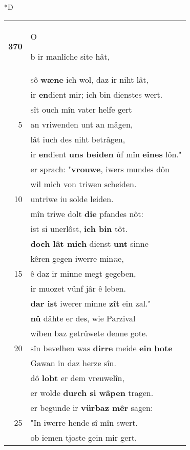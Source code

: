 \documentclass[8pt,a4paper,notitlepage]{article}
\begin{document}
\begin{table}[ht]
\begin{minipage}[t]{0.5\linewidth}
\small
\begin{center}*D
\end{center}
\begin{tabular}{rl}
\textbf{370} & \begin{large}O\end{large}b ir manlîche site hât,\\ 
 & sô \textbf{wæne} ich wol, daz ir niht lât,\\ 
 & ir \textbf{en}dient mir; ich bin dienstes wert.\\ 
 & sît ouch mîn vater helfe gert\\ 
5 & an vriwenden unt an mâgen,\\ 
 & lât iuch des niht betrâgen,\\ 
 & ir \textbf{en}dient \textbf{uns beiden} ûf mîn \textbf{eines} lôn."\\ 
 & er sprach: "\textbf{vrouwe}, iwers mundes dôn\\ 
 & wil mich von triwen scheiden.\\ 
10 & untriwe iu solde leiden.\\ 
 & mîn triwe dolt \textbf{die} pfandes nôt:\\ 
 & ist si unerlôst, \textbf{ich bin} tôt.\\ 
 & \textbf{doch lât mich} dienst \textbf{unt} sinne\\ 
 & kêren gegen iwerre min\textit{n}e,\\ 
15 & ê daz ir minne megt gegeben,\\ 
 & ir muozet vünf jâr ê leben.\\ 
 & \textbf{dar ist} iwerer minne \textbf{zît} ein zal."\\ 
 & \textbf{nû} dâhte er des, wie Parzival\\ 
 & wîben baz getrûwete denne gote.\\ 
20 & sîn bevelhen was \textbf{dirre} meide \textbf{ein} \textbf{bote}\\ 
 & Gawan in daz herze sîn.\\ 
 & dô \textbf{lobt} er dem vreuwelîn,\\ 
 & er wolde \textbf{durch si wâpen} tragen.\\ 
 & er begunde ir \textbf{vürbaz mêr} sagen:\\ 
25 & "In iwerre hende sî mîn swert.\\ 
 & ob iemen tjoste gein mir gert,\\ 

\end{tabular}
\end{minipage}
\end{table}
\end{document}
